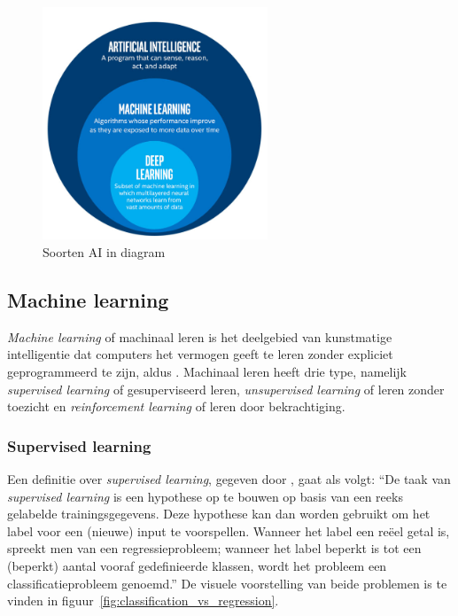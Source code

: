 \begin{figure}
    \centering
    \includegraphics[width=0.6\textwidth]{./img/ai_fields}
    \caption{\label{fig:soorten_ai_diagram} Soorten AI in diagram~\autocite{Bansal2019}}
\end{figure}

\subsection{Machine learning}
\textit{Machine learning} of machinaal leren is het deelgebied van kunstmatige intelligentie dat computers het vermogen geeft te leren zonder expliciet geprogrammeerd te zijn, aldus \textcite{Lievens2021}. Machinaal leren heeft drie type, namelijk \textit{supervised learning} of gesuperviseerd leren, \textit{unsupervised learning} of leren zonder toezicht en \textit{reinforcement learning} of leren door bekrachtiging.

\subsubsection{Supervised learning}
Een definitie over \textit{supervised learning}, gegeven door \textcite{Lievens2021}, gaat als volgt: ``De taak van \textit{supervised learning} is een hypothese op te bouwen op basis van een reeks gelabelde trainingsgegevens. Deze hypothese kan dan worden gebruikt om het label voor een (nieuwe) input te voorspellen. Wanneer het label een reëel getal is, spreekt men van een regressieprobleem; wanneer het label beperkt is tot een (beperkt) aantal vooraf gedefinieerde klassen, wordt het probleem een classificatieprobleem genoemd.''
De visuele voorstelling van beide problemen is te vinden in figuur~\ref{fig:classification_vs_regression}.

